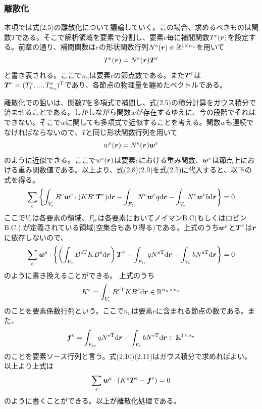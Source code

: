 \documentclass[dvipdfmx, 9pt, a4paper]{jsarticle}
\numberwithin{equation}{section}
\newcommand{\bm}[1]{{\mbox{\boldmath $#1$}}}
\begin{document}
\subsubsection{離散化}
本項では式(2.5)の離散化について議論していく。この場合、求めるべきものは関数$T$である。そこで解析領域を要素で分割し、要素$e$毎に補間関数$T^e(\bm r)$を設定する。前章の通り、補間関数は$e$の形状関数行列$N^e(\bm r) \in \mathbb{R}^{1 \times n_n}$を用いて
\begin{equation}
T^e(\bm r)=N^e(\bm r)\bm T^e
\end{equation}
と書き表される。ここで$n_n$は要素$e$の節点数である。また$\bm T^e$は$\bm T^e=(T^e_1, ..., T^e_{n_n})^{\rm T}$であり、各節点の物理量を纏めたベクトルである。\par
離散化での狙いは、関数$T$を多項式で補間し、式(2.5)の積分計算をガウス積分で済ませることである。しかしながら関数$w$が存在するゆえに、今の段階でそれはできない。そこで$w$に関しても多項式で近似することを考える。関数$w$も連続でなければならないので、$T$と同じ形状関数行列を用いて
\begin{equation}
w^e(\bm r)=N^e(\bm r)\bm w^e
\end{equation}
のように近似できる。ここで$w^e(\bm r)$は要素$e$における重み関数、$\bm w^e$は節点上における重み関数値である。以上より、式(2.8)(2.9)を式(2.5)に代入すると、以下の式を得る。
\begin{equation}
\sum_e\left\{ \int_{V_e}B^e\bm w^e\cdot(KB^e\bm T^e){\rm d}\bm r - \int_{F_{te}}N^e\bm w^eq{\rm d}\bm r-\int_{V_e}N^e\bm w^eb{\rm d}\bm r  \right\}=0 \notag
\end{equation}
ここで$V_e$は各要素の領域、$F_{te}$は各要素においてノイマンB.C(もしくはロビンB.C.).が定義されている領域(空集合もあり得る)である。上式のうち$\bm w^e$と$\bm T^e$は$\bm r$に依存しないので、
\begin{equation}
\sum_e\bm w^e \cdot \left\{ \left( \int_{V_e} B^{e\rm T}KB^e {\rm d}\bm r \right)\bm T^e-\int_{F_{te}}qN^{e\rm T}{\rm d}\bm r-\int_{V_e}bN^{e\rm T}{\rm d}\bm r \right\}=0 \notag
\end{equation}
のように書き換えることができる。
上式のうち
\begin{equation}
K^e = \int_{V_e} B^{e\rm T}KB^e {\rm d}\bm r \in \mathbb{R}^{n_n \times n_n}
\end{equation}
のことを要素係数行列という。ここで$n_n$は要素$e$に含まれる節点の数である。また、
\begin{equation}
\bm f^e = \int_{F_{te}}qN^{e\rm T}{\rm d}\bm r+\int_{V_e}bN^{e\rm T}{\rm d}\bm r \in \mathbb{R}^{1\times n_n}
\end{equation}
のことを要素ソース行列と言う。式(2.10)(2.11)はガウス積分で求めればよい。以上より上式は
\begin{equation}
\sum_e \bm w^e\cdot(K^e\bm T^e-\bm f^e)=0
\end{equation}
のように書くことができる。以上が離散化処理である。
\end{document}
